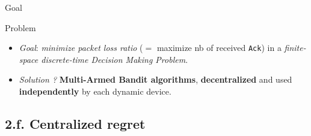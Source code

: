 \documentclass[12pt,english,ignorenonframetext,aspectratio=169,]{beamer}
\providecommand{\tightlist}{%
  \setlength{\itemsep}{0pt}\setlength{\parskip}{0pt}}
\begin{document}
\begin{frame}[fragile]{Goal}

\begin{block}{Problem}

\begin{itemize}\tightlist
\item
  \emph{Goal}: \emph{minimize packet loss ratio} (\(=\) maximize nb of
  received \texttt{Ack}) in a \emph{finite-space discrete-time Decision
  Making Problem}.
\item
  \emph{Solution ?} \textbf{Multi-Armed Bandit algorithms},
  \textbf{decentralized} and used \textbf{independently} by each dynamic
  device.
\end{itemize}

\end{block}




\end{frame}



\subsection{\hfill{}2.f. Centralized regret\hfill{}}
\end{document}

